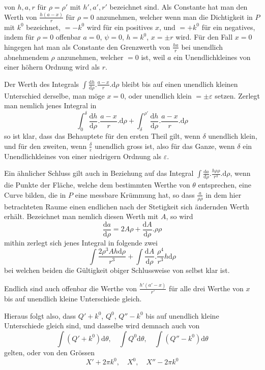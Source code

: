 %
von $h,a,r$ für $\rho=\rho'$ mit $h',a',r'$ bezeichnet sind. Als Constante hat man den Werth von $\frac{h(a-x)}{r}$ für $\rho=0$ anzunehmen, welcher wenn man die Dichtigkeit in $P$ mit $k^0$ bezeichnet, $=-k^0$ wird für ein positives $x$, und $=+k^0$ für ein negatives, indem für $\rho=0$ offenbar $a=0$, $\psi=0$, $h=k^0$, $x=\pm r$ wird. Für den Fall $x=0$ hingegen hat man als Constante den Grenzwerth von $\frac{ha}{r}$ bei unendlich abnehmendem $\rho$ anzunehmen, welcher $=0$ ist, weil $a$ ein Unendlichkleines von einer höhern Ordnung wird als $r$.

Der Werth des Integrals $\int\frac{\mathrm dh}{\mathrm d\rho}.\frac{a-x}{r}.\mathrm d\rho$ bleibt bis auf einen unendlich kleinen Unterschied derselbe, man möge $x=0$, oder unendlich klein $=\pm\varepsilon$ setzen. Zerlegt man nemlich jenes Integral in
\[
\int_0^\delta\frac{\mathrm dh}{\mathrm d\rho}.\frac{a-x}{r}.\mathrm d\rho+\int_\delta^{\rho'}\frac{\mathrm dh}{\mathrm d\rho}.\frac{a-x}{r}.\mathrm d\rho
\]
so ist klar, dass das Behauptete für den ersten Theil gilt, wenn $\delta$ unendlich klein, und für den zweiten, wenn $\frac{\delta}{\varepsilon}$ unendlich gross ist, also für das Ganze, wenn $\delta$ ein Unendlichkleines von einer niedrigern Ordnung als $\varepsilon$.

Ein ähnlicher Schluss gilt auch in Beziehung auf das Integral $\int\frac{\mathrm da}{\mathrm d\rho}.\frac{h\rho\rho}{r^3}.\mathrm d\rho$, wenn die Punkte der Fläche, welche dem bestimmten Werthe von $\theta$ entsprechen, eine Curve bilden, die in $P$ eine messbare Krümmung hat, so dass $\frac{a}{\rho\rho}$ in dem hier betrachteten Raume einen endlichen nach der Stetigkeit sich ändernden Werth erhält. Bezeichnet man nemlich diesen Werth mit $A$, so wird
\[
\frac{\mathrm da}{\mathrm d\rho}=2A\rho+\frac{\mathrm dA}{\mathrm d\rho}.\rho\rho
\]
mithin zerlegt sich jenes Integral in folgende zwei
\[
\int\frac{2\rho^3Ah\mathrm d\rho}{r^3}+\int\frac{\mathrm dA}{\mathrm d\rho}.\frac{\rho^4}{r^3}h\mathrm d\rho
\]
bei welchen beiden die Gültigkeit obiger Schlussweise von selbst klar ist.

Endlich sind auch offenbar die Werthe von $\frac{h'(a'-x)}{r'}$ für alle drei Werthe von $x$ bis auf unendlich kleine Unterschiede gleich.

Hieraus folgt also, dass $Q'+k^0$, $Q^0$, $Q''-k^0$ bis auf unendlich kleine Unterschiede gleich sind, und dasselbe wird demnach auch von
\[
\int(Q'+k^0)\mathrm d\theta,\quad\int Q^0\mathrm d\theta,\quad\int(Q''-k^0)\mathrm d\theta
\]
gelten, oder von den Grössen
\[
X'+2\pi k^0,\quad X^0,\quad X''-2\pi k^0
\]

